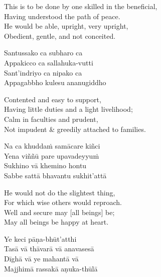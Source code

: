 \begin{english-verses}
  This is to be done by one skilled in the beneficial,\\
  Having understood the path of peace.\\
  He would be able, upright, very upright,\\
  Obedient, gentle, and not conceited.
\end{english-verses}

\begin{pali-hang-continued}
  Santussako ca subharo ca\\
  Appakicco ca sallahuka-vutti\\
  Sant'indriyo ca nipako ca\\
  Appagabbho kulesu ananugiddho
\end{pali-hang-continued}

\begin{english-verses}
  Contented and easy to support,\\
  Having little duties and a light livelihood;\\
  Calm in faculties and prudent,\\
  Not impudent \& greedily attached to families.
\end{english-verses}

\ifninebythirteen\clearpage\fi

\begin{pali-hang-continued}
  Na ca khuddaṁ samācare kiñci\\
  Yena viññū pare upavadeyyuṁ\\
  Sukhino vā khemino hontu\\
  Sabbe sattā bhavantu sukhit'attā
\end{pali-hang-continued}

\ifbfive\clearpage\fi
\ifafive\clearpage\fi

\begin{english-verses}
  He would not do the slightest thing,\\
  For which wise others would reproach.\\
  Well and secure may [all beings] be;\\
  May all beings be happy at heart.
\end{english-verses}

\begin{pali-hang-continued}
  Ye keci pāṇa-bhūt'atthi\\
  Tasā vā thāvarā vā anavasesā\\
  Dīghā vā ye mahantā vā\\
  Majjhimā rassakā aṇuka-thūlā
\end{pali-hang-continued}

